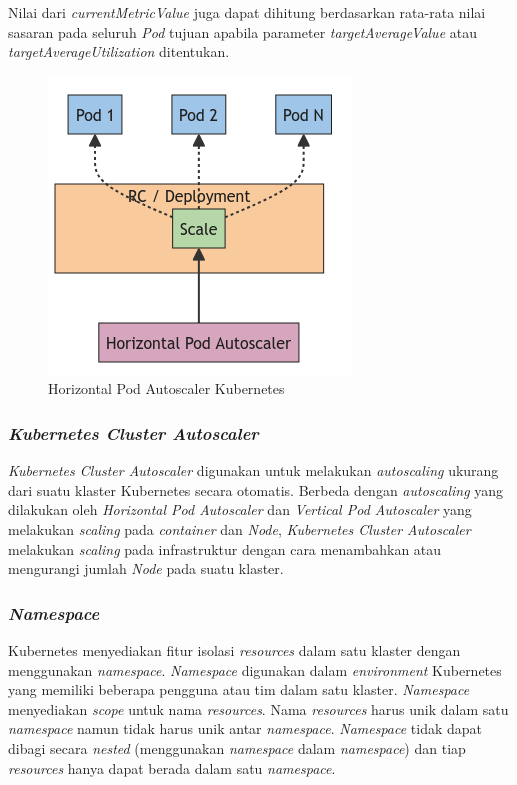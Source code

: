 Nilai dari \emph{currentMetricValue} juga dapat dihitung berdasarkan rata-rata nilai
sasaran pada seluruh \emph{Pod} tujuan apabila parameter \emph{targetAverageValue} atau
\emph{targetAverageUtilization} ditentukan.

\begin{figure} [H] \centering
  \includegraphics[scale=0.6]{gambar/horizontal_pod_autoscalling_figure.png}
  \caption{Horizontal Pod Autoscaler Kubernetes \parencite{kubernetes-website-hpa}}
  \label{fig:HorizontalPodAutoscalling}
\end{figure}

\subsubsection{\emph{Kubernetes Cluster Autoscaler}}

\emph{Kubernetes Cluster Autoscaler} digunakan untuk melakukan \emph{autoscaling}
ukurang dari suatu klaster Kubernetes secara otomatis. Berbeda dengan \emph{autoscaling}
yang dilakukan oleh \emph{Horizontal Pod Autoscaler} dan \emph{Vertical Pod Autoscaler} yang
melakukan \emph{scaling} pada \emph{container} dan \emph{Node}, \emph{Kubernetes Cluster Autoscaler}
melakukan \emph{scaling} pada infrastruktur dengan cara menambahkan atau mengurangi jumlah
\emph{Node} pada suatu klaster.

\subsubsection{\emph{Namespace}}

Kubernetes menyediakan fitur isolasi \emph{resources} dalam satu klaster dengan
menggunakan \emph{namespace}. \emph{Namespace} digunakan dalam \emph{environment}
Kubernetes yang memiliki beberapa pengguna atau tim dalam satu klaster. \emph{Namespace}
menyediakan \emph{scope} untuk nama \emph{resources}. Nama \emph{resources} harus unik
dalam satu \emph{namespace} namun tidak harus unik antar \emph{namespace}. \emph{Namespace}
tidak dapat dibagi secara \emph{nested} (menggunakan \emph{namespace} dalam \emph{namespace})
dan tiap \emph{resources} hanya dapat berada dalam satu \emph{namespace}.


